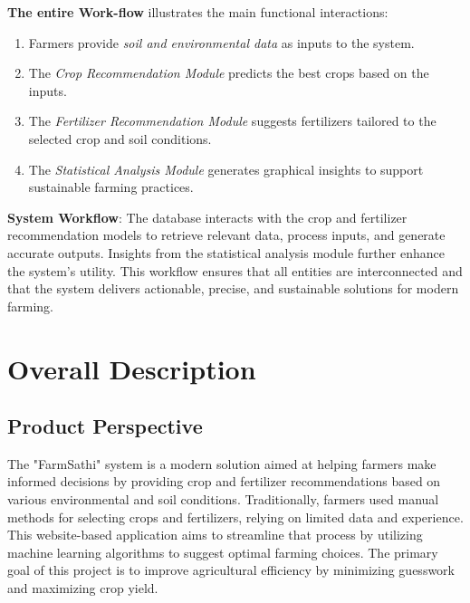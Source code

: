 \documentclass{scrreprt}
\begin{document}
\textbf{The entire Work-flow} illustrates the main functional interactions:  
\begin{enumerate}
    \item Farmers provide \textit{soil and environmental data} as inputs to the system.
    \item The \textit{Crop Recommendation Module} predicts the best crops based on the inputs.
    \item The \textit{Fertilizer Recommendation Module} suggests fertilizers tailored to the selected crop and soil conditions.
    \item The \textit{Statistical Analysis Module} generates graphical insights to support sustainable farming practices.
\end{enumerate}
\newline
\textbf{System Workflow}: The database interacts with the crop and fertilizer recommendation models to retrieve relevant data, process inputs, and generate accurate outputs. Insights from the statistical analysis module further enhance the system's utility.  
\newline
This workflow ensures that all entities are interconnected and that the system delivers actionable, precise, and sustainable solutions for modern farming.  

\chapter{Overall Description}

\section{Product Perspective}
The "FarmSathi" system is a modern solution aimed at helping farmers make informed decisions by providing crop and fertilizer recommendations based on various environmental and soil conditions. Traditionally, farmers used manual methods for selecting crops and fertilizers, relying on limited data and experience. This website-based application aims to streamline that process by utilizing machine learning algorithms to suggest optimal farming choices. The primary goal of this project is to improve agricultural efficiency by minimizing guesswork and maximizing crop yield.
\end{document}

